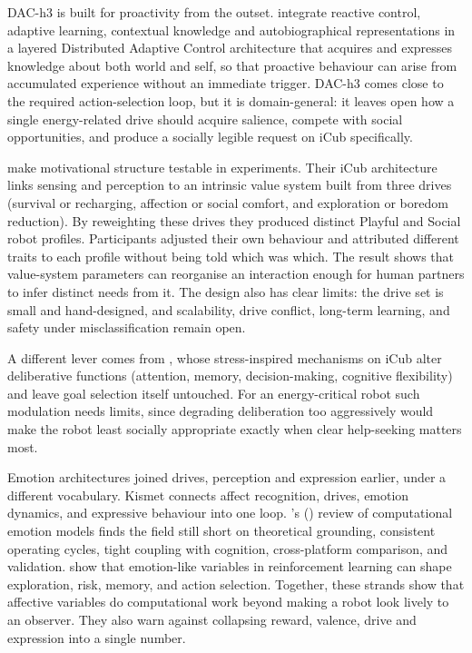 DAC-h3 is built for proactivity from the outset. \citet{MoulinFrier2018DACH3} integrate reactive control, adaptive learning, contextual knowledge and autobiographical representations in a layered Distributed Adaptive Control architecture that acquires and expresses knowledge about both world and self, so that proactive behaviour can arise from accumulated experience without an immediate trigger. DAC-h3 comes close to the required action-selection loop, but it is domain-general: it leaves open how a single energy-related drive should acquire salience, compete with social opportunities, and produce a socially legible request on iCub specifically.

\citet{Berto2025CuriosityAffect} make motivational structure testable in experiments. Their iCub architecture links sensing and perception to an intrinsic value system built from three drives (survival or recharging, affection or social comfort, and exploration or boredom reduction). By reweighting these drives they produced distinct Playful and Social robot profiles. Participants adjusted their own behaviour and attributed different traits to each profile without being told which was which. The result shows that value-system parameters can reorganise an interaction enough for human partners to infer distinct needs from it. The design also has clear limits: the drive set is small and hand-designed, and scalability, drive conflict, long-term learning, and safety under misclassification remain open.

A different lever comes from \citet{Carminatti2025Stress}, whose stress-inspired mechanisms on iCub alter deliberative functions (attention, memory, decision-making, cognitive flexibility) and leave goal selection itself untouched. For an energy-critical robot such modulation needs limits, since degrading deliberation too aggressively would make the robot least socially appropriate exactly when clear help-seeking matters most.

Emotion architectures joined drives, perception and expression earlier, under a different vocabulary. Kismet \citep{Breazeal2003Emotion} connects affect recognition, drives, emotion dynamics, and expressive behaviour into one loop. \citeauthor{RodriguezRamos2015Emotions}'s (\citeyear{RodriguezRamos2015Emotions}) review of computational emotion models finds the field still short on theoretical grounding, consistent operating cycles, tight coupling with cognition, cross-platform comparison, and validation. \citet{Moerland2018EmotionRL} show that emotion-like variables in reinforcement learning can shape exploration, risk, memory, and action selection. Together, these strands show that affective variables do computational work beyond making a robot look lively to an observer. They also warn against collapsing reward, valence, drive and expression into a single number.

